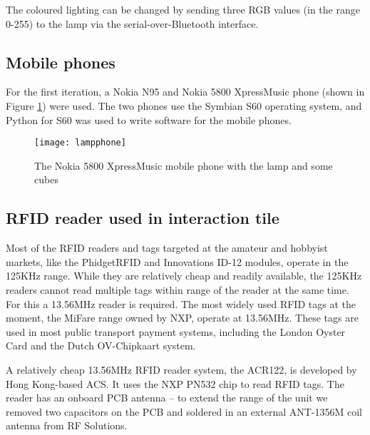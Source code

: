 The coloured lighting can be changed by sending three RGB values (in the range 0-255) to the lamp via the serial-over-Bluetooth interface.

\subsection{Mobile phones}

For the first iteration, a Nokia N95 and Nokia 5800 XpressMusic phone (shown in Figure \ref{lampphone}) were used. The two phones use the Symbian S60 operating system, and Python for S60 was used to write software for the mobile phones.

\begin{figure}[bth]
\centering
\texttt{[image: lampphone]}
\caption{The Nokia 5800 XpressMusic mobile phone with the lamp and some cubes}
\label{lampphone}
\end{figure}

\subsection{RFID reader used in interaction tile}

Most of the \ac{RFID} readers and tags targeted at the amateur and hobbyist markets, like the PhidgetRFID and Innovations ID-12 modules, operate in the 125KHz range. While they are relatively cheap and readily available, the 125KHz readers cannot read multiple tags within range of the reader at the same time. For this a 13.56MHz reader is required. The most widely used \ac{RFID} tags at the moment, the MiFare range owned by NXP, operate at 13.56MHz. These tags are used in most public transport payment systems, including the London Oyster Card and the Dutch OV-Chipkaart system.

A relatively cheap 13.56MHz \ac{RFID} reader system, the ACR122, is developed by Hong Kong-based \ac{ACS}. It uses the NXP PN532 chip to read \ac{RFID} tags.  The reader has an onboard PCB antenna -- to extend the range of the unit we removed two capacitors on the PCB and soldered in an external ANT-1356M coil antenna from RF Solutions.



